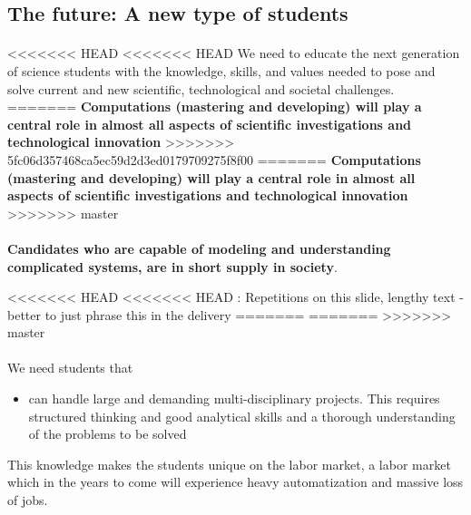\documentclass[%
<<<<<<< HEAD
<<<<<<< HEAD
oneside,                 %
final,                   %
=======
twoside,                 %
final,                   %
>>>>>>> 5fc06d357468ca5ec59d2d3ed0179709275f8f00
=======
oneside,                 %
final,                   %
>>>>>>> master
10pt]{article}
\newcommand{\shortinlinecomment}[3]{{\color{red}{\bf #1}: #2}}
\begin{document}
\begin{itemize}
\subsection*{The future: A new type of students}


\paragraph{}
<<<<<<< HEAD
<<<<<<< HEAD
We need to educate the next generation of
science students with the knowledge, skills, and values needed to pose
and solve current and new scientific, technological and societal
challenges.
=======
\textbf{Computations (mastering and developing)  will play a central role in almost all aspects of scientific investigations and technological innovation}
>>>>>>> 5fc06d357468ca5ec59d2d3ed0179709275f8f00
=======
\textbf{Computations (mastering and developing)  will play a central role in almost all aspects of scientific investigations and technological innovation}
>>>>>>> master




\paragraph{}
\textbf{Candidates who are capable of modeling and understanding complicated
systems, are in short supply in society}.



<<<<<<< HEAD
<<<<<<< HEAD
\shortinlinecomment{hpl 2}{ Repetitions on this slide, lengthy text - better to just phrase this in the delivery }{ Repetitions on this slide, }
=======
=======
>>>>>>> master
\paragraph{}
We need students that
\begin{itemize}
\item can handle large and demanding multi-disciplinary  projects. This requires structured thinking and good analytical skills and a thorough understanding of the problems to be solved
\end{itemize}

\noindent
This knowledge makes the students unique on the labor market, a labor market which in the years to come will experience heavy automatization and massive loss of jobs.



\end{itemize}
\end{document}
